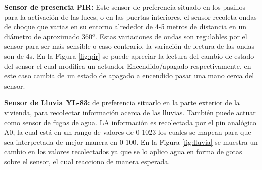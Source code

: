 \documentclass[11pt,letterpaper]{report}
\begin{document}
		\textbf{Sensor de presencia PIR:} Este sensor de preferencia situado en los pasillos  para la activación de las luces, o en las puertas interiores, el sensor recoleta ondas de choque que varias en su entorno alrededor de 4-5 metros de distancia en un diámetro de aproximado 360º. Estas variaciones de ondas son regulables por el sensor para  ser más sensible o caso contrario, la variación de lectura de las ondas son  de 4s. En la Figura \ref{fig:pir} se puede apreciar la lectura  del cambio de estado del sensor el cual modifica un actuador Encendido/apagado respectivamente, en este caso cambia de un estado de apagado a encendido pasar una mano cerca del sensor.		
			
		\textbf{Sensor de Lluvia YL-83:} de preferencia situarlo en la parte exterior de la vivienda, para recolectar información acerca de las lluvias. También puede actuar como sensor de fugas de agua. LA información es recolectada por el pin analógico A0, la cual está en un rango de valores de 0-1023 los cuales se mapean para que sea interpretada  de mejor manera en 0-100. En la Figura \ref{fig:lluvia} se muestra un cambio en los valores recolectados ya que se lo aplico agua en forma de gotas sobre el sensor, el cual reacciono de manera esperada.
		
\end{document}
